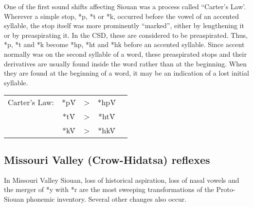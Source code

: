 \documentclass[output=paper]{LSP/langsci}
\begin{document}
One of the first sound shifts affecting Siouan was a process called ``Carter's Law'.  Wherever a simple stop, *p, *t or *k, occurred before the vowel of an accented syllable, the stop itself was more prominently ``marked'', either by lengthening it or by preaspirating it.  In the CSD, these are considered to be preaspirated.  Thus, *p, *t and *k become *hp, *ht and *hk before an accented syllable.  Since accent normally was on the second syllable of a word, these preaspirated stops and their derivatives are usually found inside the word rather than at the beginning.  When they are found at the beginning of a word, it may be an indication of a lost initial syllable.
\begin{center}
\begin{tabular}[t]{c c c c c }

Carter's Law: & *p\'V & > & *hp\'V  \\

& *t\'V & >  & *ht\'V \\

&  *k\'V & >  & *hk\'V\\
\end{tabular}
\end{center}

\subsection{Missouri Valley (Crow-Hidatsa) reflexes}

In Missouri Valley Siouan, loss of historical aspiration, loss of nasal vowels and the merger of *y with *r are the most sweeping transformations of the Proto-Siouan phonemic inventory.  Several other changes also occur.
\end{document}
